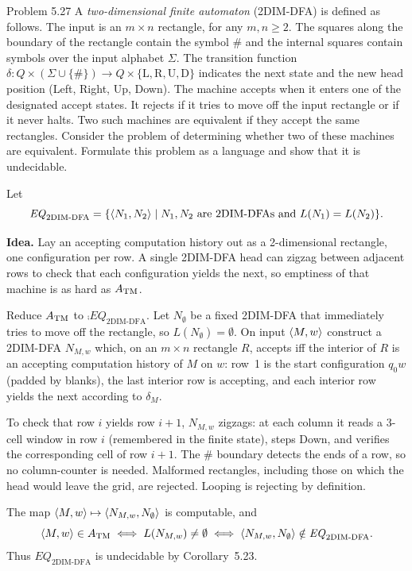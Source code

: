 \begin{question}{Problem 5.27}
A \emph{two-dimensional finite automaton} (2DIM-DFA) is defined as follows. The input is an $m\times n$ rectangle, for any $m,n\ge 2$. The squares along the boundary of the rectangle contain the symbol $\#$ and the internal squares contain symbols over the input alphabet $\Sigma$. The transition function $\delta:Q\times(\Sigma\cup\{\#\})\to Q\times\{\mathrm{L},\mathrm{R},\mathrm{U},\mathrm{D}\}$ indicates the next state and the new head position (Left, Right, Up, Down). The machine accepts when it enters one of the designated accept states. It rejects if it tries to move off the input rectangle or if it never halts. Two such machines are equivalent if they accept the same rectangles. Consider the problem of determining whether two of these machines are equivalent. Formulate this problem as a language and show that it is undecidable.
\end{question}
\begin{soln}
Let
\[
\mathit{EQ}_{\mathrm{2DIM\text{-}DFA}}
=\{\langle N_1,N_2\rangle\mid N_1,N_2\text{ are 2DIM-DFAs and }L(N_1)=L(N_2)\}.
\]

\textbf{Idea.} Lay an accepting computation history out as a 2-dimensional rectangle, one configuration per row. A single 2DIM-DFA head can zigzag between adjacent rows to check that each configuration yields the next, so emptiness of that machine is as hard as $A_{\mathrm{TM}}$.

Reduce $A_{\mathrm{TM}}$ to $\comp{\mathit{EQ}_{\mathrm{2DIM\text{-}DFA}}}$. Let $N_\emptyset$ be a fixed 2DIM-DFA that immediately tries to move off the rectangle, so $L(N_\emptyset)=\emptyset$. On input $\langle M,w\rangle$ construct a 2DIM-DFA $N_{M,w}$ which, on an $m\times n$ rectangle $R$, accepts iff the interior of $R$ is an accepting computation history of $M$ on $w$: row~1 is the start configuration $q_0w$ (padded by blanks), the last interior row is accepting, and each interior row yields the next according to $\delta_M$.

To check that row $i$ yields row $i+1$, $N_{M,w}$ zigzags: at each column it reads a 3-cell window in row $i$ (remembered in the finite state), steps Down, and verifies the corresponding cell of row $i+1$. The $\#$ boundary detects the ends of a row, so no column-counter is needed. Malformed rectangles, including those on which the head would leave the grid, are rejected. Looping is rejecting by definition.

The map $\langle M,w\rangle\mapsto\langle N_{M,w},N_\emptyset\rangle$ is computable, and
\[
\langle M,w\rangle\in A_{\mathrm{TM}} \iff L(N_{M,w})\neq\emptyset \iff \langle N_{M,w},N_\emptyset\rangle\notin\mathit{EQ}_{\mathrm{2DIM\text{-}DFA}}.
\]
Thus $\mathit{EQ}_{\mathrm{2DIM\text{-}DFA}}$ is undecidable by Corollary~5.23.
\end{soln}

